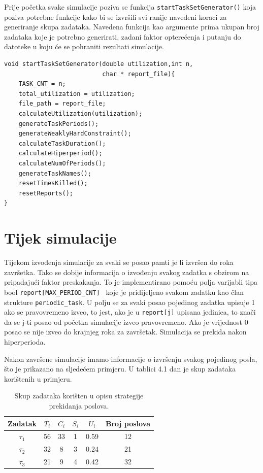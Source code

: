 \documentclass[../zavrsni.tex]{subfiles}
\begin{document}
Prije početka svake simulacije poziva se funkcija \texttt{startTaskSetGenerator()} koja poziva potrebne funkcije kako bi se izvršili 
svi ranije navedeni koraci za generiranje skupa zadataka. Navedena funkcija kao argumente prima ukupan broj zadataka koje je potrebno generirati, zadani 
faktor opterećenja i putanju do datoteke u koju će se pohraniti rezultati simulacije.
\begin{lstlisting}[style=CStyle,caption={Funckija \texttt{startTaskSetGenerator()}},captionpos=b]
void startTaskSetGenerator(double utilization,int n,
                           char * report_file){
    TASK_CNT = n; 
    total_utilization = utilization; 
    file_path = report_file;
    calculateUtilization(utilization);
    generateTaskPeriods();
    generateWeaklyHardConstraint();
    calculateTaskDuration();
    calculateHiperperiod();
    calculateNumOfPeriods();
    generateTaskNames();
    resetTimesKilled();
    resetReports();
}
\end{lstlisting}
\section{Tijek simulacije}

Tijekom izvođenja simulacije za svaki se posao pamti je li izvršen do roka završetka.  
Tako se dobije informacija o izvođenju svakog zadatka s obzirom na pripadajući faktor preskakanja. To je implementirano 
pomoću polja varijabli tipa bool \texttt{report[MAX\_PERIOD\_CNT] } koje je pridijeljeno svakom zadatku kao član strukture \texttt{periodic\_task}.
U polju se za svaki posao pojedinog zadatka upisuje 1 ako se pravovremeno izveo, to jest, ako je u \texttt{report[j]} upisana jedinica, to znači da se 
j-ti posao od početka simulacije izveo pravovremeno. Ako je vrijednost 0 posao se nije izveo do krajnjeg roka za završetak.
Simulacija se prekida nakon hiperperioda.

Nakon završene simulacije imamo informacije o izvršenju svakog pojedinog posla, što je prikazano na sljedećem primjeru. U tablici 4.1 dan je 
skup zadataka korištenih u primjeru.

\begin{table}[h!]
    \begin{center}
      \begin{tabular}{||c || c | c | c | c | c||} 
       \hline
       Zadatak & $T_i$ & $C_i$ & $S_i$ & $U_i$ & Broj poslova \\ [0.5ex] 
       \hline\hline
       $\tau_1$ & 56 & 33 & 1 & 0.59 & 12 \\ 
       \hline
       $\tau_2$ & 32 & 8 & 3 & 0.24 & 21 \\
       \hline
       $\tau_3$ & 21 & 9 & 4 & 0.42 & 32 \\
       \hline
      \end{tabular}
    \end{center}
    \caption{\label{tab:table-name}Skup zadataka korišten u opisu strategije prekidanja poslova.}
    \end{table}
\end{document}
